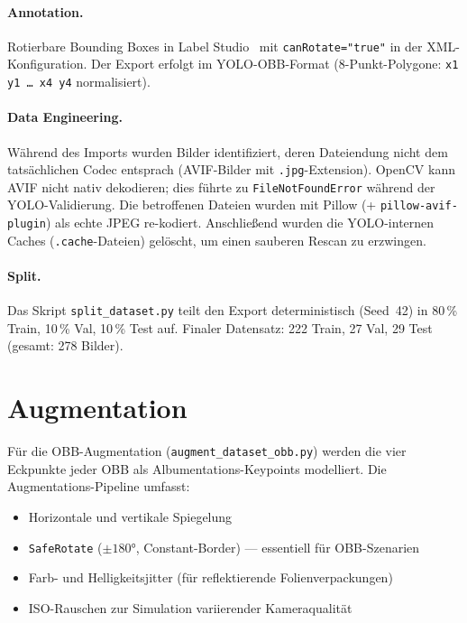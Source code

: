 \documentclass[a4paper, 11pt]{scrartcl}
\begin{document}
\paragraph{Annotation.}
Rotierbare Bounding Boxes in Label Studio~\cite{labelstudio2024} mit \texttt{canRotate="true"} in der XML-Konfiguration.
Der Export erfolgt im YOLO-OBB-Format (8-Punkt-Polygone: \texttt{x1 y1 \ldots\ x4 y4} normalisiert).

\paragraph{Data Engineering.}
Während des Imports wurden Bilder identifiziert, deren Dateiendung nicht dem tatsächlichen Codec entsprach (AVIF-Bilder mit \texttt{.jpg}-Extension).
OpenCV kann AVIF nicht nativ dekodieren; dies führte zu \texttt{FileNotFoundError} während der YOLO-Validierung.
Die betroffenen Dateien wurden mit Pillow (+ \texttt{pillow-avif-plugin}) als echte JPEG re-kodiert.
Anschließend wurden die YOLO-internen Caches (\texttt{.cache}-Dateien) gelöscht, um einen sauberen Rescan zu erzwingen.

\paragraph{Split.}
Das Skript \texttt{split\_dataset.py} teilt den Export deterministisch (Seed~42) in 80\,\% Train, 10\,\% Val, 10\,\% Test auf.
Finaler Datensatz: 222 Train, 27 Val, 29 Test (gesamt: 278 Bilder).

\section{Augmentation}

Für die OBB-Augmentation (\texttt{augment\_dataset\_obb.py}) werden die vier Eckpunkte jeder OBB als Albumentations-Keypoints modelliert.
Die Augmentations-Pipeline umfasst:

\begin{itemize}
    \item Horizontale und vertikale Spiegelung
    \item \texttt{SafeRotate} ($\pm 180°$, Constant-Border) --- essentiell für OBB-Szenarien
    \item Farb- und Helligkeitsjitter (für reflektierende Folienverpackungen)
    \item ISO-Rauschen zur Simulation variierender Kameraqualität
\end{itemize}
\end{document}
